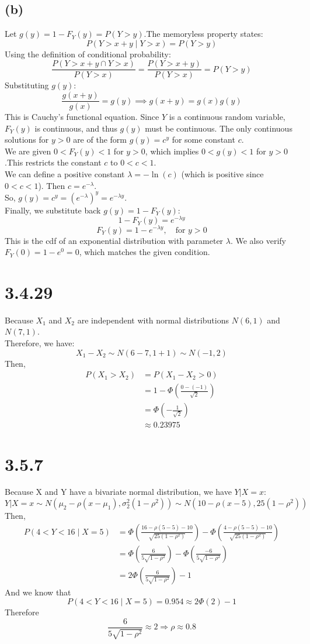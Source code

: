 \documentclass{article}
\begin{document}
\subsection*{(b)}
Let \(g(y) = 1 - F_Y(y) = P(Y > y)\).The memoryless property states:
\[
P(Y > x + y \mid Y > x) = P(Y > y)
\]
Using the definition of conditional probability:
\[
\frac{P(Y > x + y \cap Y > x)}{P(Y > x)} = 
\frac{P(Y > x + y)}{P(Y > x)} =
P(Y > y)
\]
Substituting $g(y)$:
\[
\frac{g(x + y)}{g(x)} = g(y) \implies g(x + y) = g(x)g(y)
\]
This is Cauchy's functional equation. Since $Y$ is a continuous random variable, 
$F_Y(y)$ is continuous, and thus $g(y)$ must be continuous. 
The only continuous solutions for $y > 0$ are of the form $g(y) = c^y$ 
for some constant $c$.\\
We are given $0 < F_Y(y) < 1$ for $y > 0$, 
which implies $0 < g(y) < 1$ for $y > 0$.This restricts the constant $c$ to 
$0 < c < 1$.\\
We can define a positive constant $\lambda = -\ln(c)$ (which is positive since $0 < c < 1$).
Then $c = e^{-\lambda}$.\\
So, $g(y) = c^y = (e^{-\lambda})^y = e^{-\lambda y}$.\\
Finally, we substitute back $g(y) = 1 - F_Y(y)$:
$$1 - F_Y(y) = e^{-\lambda y}$$
$$F_Y(y) = 1 - e^{-\lambda y}, \quad \text{for } y > 0$$
This is the cdf of an exponential distribution with parameter $\lambda$. 
We also verify $F_Y(0) = 1 - e^0 = 0$, which matches the given condition.
\section*{3.4.29}
Because $X_1$ and $X_2$ are independent with normal distributions $N(6, 1)$ and
$N(7, 1)$.\\
Therefore, we have:
\[
X_1-X_2 \sim N(6-7,1+1) \sim N(-1,2)
\]
Then,
\begin{align*}
P(X_1>X_2) &= P(X_1-X_2 >0)\\
&=1-\Phi(\frac{0-(-1)}{\sqrt{2}})\\
&=\Phi(-\frac{1}{\sqrt{2}})\\
&\approx 0.23975
\end{align*}
\section*{3.5.7}
Because X and Y have a bivariate normal distribution, we have $Y|X=x$:
\[
Y|X=x \sim N(\mu_2 - \rho (x - \mu_1), \sigma_2^2(1-\rho^2))
\sim N(10 - \rho (x - 5), 25(1-\rho^2))
\]
Then,
\begin{align*}
P(4<Y<16 \mid X=5)&=\Phi\left(\frac{16-\rho (5 - 5) -10}{\sqrt{25(1-\rho^2)}}\right)-
\Phi\left(\frac{4-\rho (5 - 5) -10}{\sqrt{25(1-\rho^2)}}\right)\\
&=\Phi\left(\frac{6}{5\sqrt{1-\rho^2}}\right)-
\Phi\left(\frac{-6}{5\sqrt{1-\rho^2}}\right)\\
&=2\Phi\left(\frac{6}{5\sqrt{1-\rho^2}}\right) -1
\end{align*}
And we know that
$$P(4<Y<16 \mid X=5) =  0.954 \approx 2\Phi(2)-1$$
Therefore
\[
\frac{6}{5\sqrt{1-\rho^2}}\approx 2 \Rightarrow \rho \approx 0.8
\]
\end{document}
